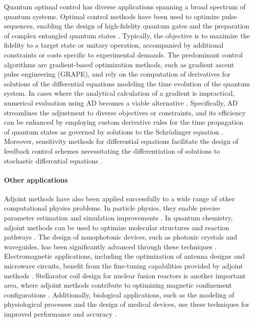 Quantum optimal control has diverse applications spanning a broad spectrum of quantum systems. 
Optimal control methods have been used to optimize pulse sequences, enabling the design of high-fidelity quantum gates and the preparation of complex entangled quantum states \cite{koch2022quantum}. 
Typically, the objective is to maximize the fidelity to a target state or unitary operation, accompanied by additional constraints or costs specific to experimental demands. 
The predominant control algorithms are gradient-based optimization methods, such as gradient ascent pulse engineering (GRAPE), and rely on the computation of derivatives for solutions of the differential equations modeling the time evolution of the quantum system. 
In cases where the analytical calculation of a gradient is impractical, numerical evaluation using AD becomes a viable alternative \cite{jirari:2009, leung:2017, abdelhafez:2019, jirari2019quantum, abdelhafez:2020, schaefer:2020, goerz:2022}. 
Specifically, AD streamlines the adjustment to diverse objectives or constraints, and its efficiency can be enhanced by employing custom derivative rules for the time propagation of quantum states as governed by solutions to the Schrödinger equation \cite{goerz:2022}. 
Moreover, sensitivity methods for differential equations facilitate the design of feedback control schemes necessitating the differentiation of solutions to stochastic differential equations \cite{schaefer:2021}.

\paragraph{Other applications}

Adjoint methods have also been applied successfully to a wide range of other computational physics problems. 
In particle physics, they enable precise parameter estimation and simulation improvements \cite{Dorigo.2022}.
In quantum chemistry, adjoint methods can be used to optimize molecular structures and reaction pathways \cite{Arrazola.2021}. 
The design of nanophotonic devices, such as photonic crystals and waveguides, has been significantly advanced through these techniques \cite{Molesky_Lin_Piggott_Jin_Vucković_Rodriguez_2018}. 
Electromagnetic applications, including the optimization of antenna designs and microwave circuits, benefit from the fine-tuning capabilities provided by adjoint methods \cite{Georgieva_Glavic_Bakr_Bandler_2002}. 
Stellarator coil design for nuclear fusion reactors is another important area, where adjoint methods contribute to optimizing magnetic confinement configurations \cite{McGreivy_stellarator_2021}.
Additionally, biological applications, such as the modeling of physiological processes and the design of medical devices, use these techniques for improved performance and accuracy \cite{Strouwen2022}.


